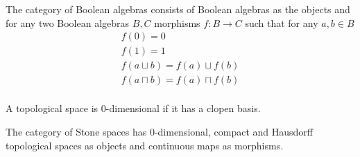 \begin{dfn}
    The category of Boolean algebras consists of Boolean algebras as the objects
    and for any two Boolean algebras $B, C$ morphisms $f:B \to C$ such that
    for any $a,b \in B$
    \begin{align*}
        f(0) = 0\\
        f(1) = 1\\
        f(a \sqcup b) = f(a) \sqcup f(b)\\
        f(a \sqcap b) = f(a) \sqcap f(b)\\
    \end{align*}
\end{dfn}

\begin{dfn}
    A topological space is $0$-dimensional if it has a clopen basis.

    The category of Stone spaces has
    $0$-dimensional, 
    compact and Hausdorff topological spaces as objects and 
    continuous maps as morphisms.
\end{dfn}

